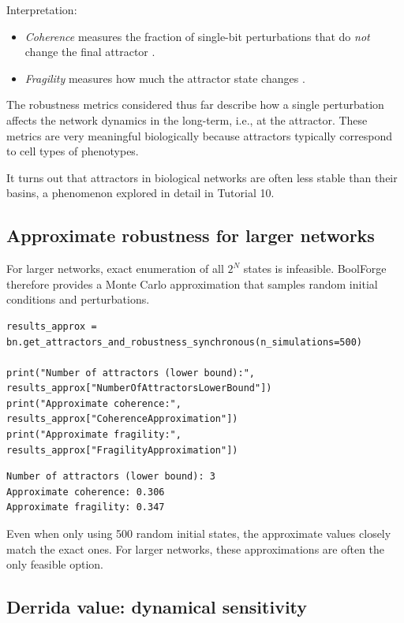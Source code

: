 \documentclass[
]{article}
\providecommand{\tightlist}{%
  \setlength{\itemsep}{0pt}\setlength{\parskip}{0pt}}
\begin{document}
Interpretation:

\begin{itemize}
\tightlist
\item
  \emph{Coherence} measures the fraction of single-bit perturbations
  that do \emph{not} change the final attractor \citep{willadsenwiles}.
\item
  \emph{Fragility} measures how much the attractor state changes
  \citep{park2023models}.
\end{itemize}

The robustness metrics considered thus far describe how a single
perturbation affects the network dynamics in the long-term, i.e., at the
attractor. These metrics are very meaningful biologically because
attractors typically correspond to cell types of phenotypes.

It turns out that attractors in biological networks are often less
stable than their basins, a phenomenon explored in detail in Tutorial
10.

\subsection{Approximate robustness for larger
networks}\label{approximate-robustness-for-larger-networks}

For larger networks, exact enumeration of all \(2^N\) states is
infeasible. BoolForge therefore provides a Monte Carlo approximation
that samples random initial conditions and perturbations.

\begin{lstlisting}
results_approx = bn.get_attractors_and_robustness_synchronous(n_simulations=500)

print("Number of attractors (lower bound):", results_approx["NumberOfAttractorsLowerBound"])
print("Approximate coherence:", results_approx["CoherenceApproximation"])
print("Approximate fragility:", results_approx["FragilityApproximation"])
\end{lstlisting}

\begin{lstlisting}
Number of attractors (lower bound): 3
Approximate coherence: 0.306
Approximate fragility: 0.347
\end{lstlisting}

Even when only using 500 random initial states, the approximate values
closely match the exact ones. For larger networks, these approximations
are often the only feasible option.

\subsection{Derrida value: dynamical
sensitivity}\label{derrida-value-dynamical-sensitivity}
\end{document}

